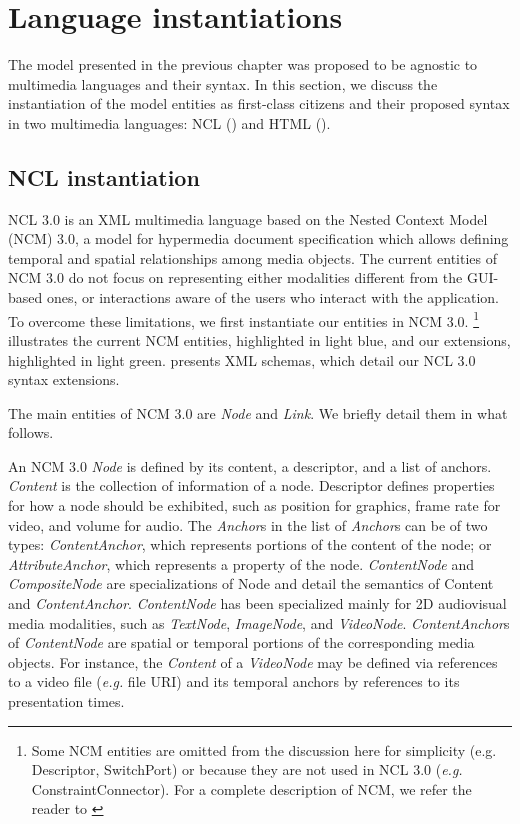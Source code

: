 \chapter{Language instantiations}
\label{chp:instantiation}

The model presented in the previous chapter was proposed to be agnostic to
multimedia languages and their syntax. In this section, we discuss the
instantiation of the model entities as first-class citizens and their proposed
syntax in two multimedia languages: NCL () and
HTML ().

\section{NCL instantiation}
\label{sec:ncl}

NCL 3.0 is an XML multimedia language based on the Nested Context Model (NCM)
3.0, a model for hypermedia document specification which allows defining
temporal and spatial relationships among media objects. The current entities of
NCM 3.0 do not focus on representing either modalities different from the
GUI-based ones, or interactions aware of the users who interact with the
application. To overcome these limitations, we first instantiate our entities in
NCM 3.0. \footnote{Some NCM entities are omitted from the
discussion here for simplicity (e.g. Descriptor, SwitchPort) or because they
are not used in NCL 3.0 (\textit{e.g.} ConstraintConnector). For a complete
description of NCM, we refer the reader to \cite{soares_nested_2009}}
illustrates the current NCM entities, highlighted in light blue, and our
extensions, highlighted in light green.  presents XML
schemas, which detail our NCL 3.0 syntax extensions.

The main entities of NCM 3.0 are \textit{Node} and \textit{Link}. We briefly
detail them in what follows.

An NCM 3.0 \textit{Node} is defined by its content, a descriptor, and a list of
anchors.
\textit{Content} is the collection of information of a node. Descriptor defines
properties for how a node should be exhibited, such as position for graphics,
frame rate for video, and volume for audio. The \textit{Anchor}s in the list of
\textit{Anchor}s
can be of two types: \textit{ContentAnchor}, which represents portions of the
content of the node; or \textit{AttributeAnchor}, which represents a property of
the node.
\textit{ContentNode} and \textit{CompositeNode} are specializations of Node and
detail the semantics of Content and \textit{ContentAnchor}. \textit{ContentNode}
has been specialized mainly for 2D audiovisual media modalities, such as
\textit{TextNode}, \textit{ImageNode}, and \textit{VideoNode}.
\textit{ContentAnchor}s of \textit{ContentNode} are spatial or temporal
portions of the corresponding media objects. For instance, the \textit{Content}
of a \textit{VideoNode} may be defined via references to a video file
(\textit{e.g.} file URI) and its temporal anchors by references to
its presentation times.

